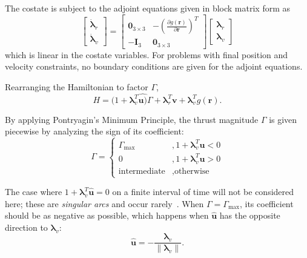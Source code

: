The costate is subject to the adjoint equations given in block matrix form as
\begin{equation}\label{eq:lambda_dot_cons}
    \begin{bmatrix}
        \dot{\boldsymbol{\lambda}}_r \\ \dot{\boldsymbol{\lambda}}_v
    \end{bmatrix} = \begin{bmatrix}
        \mathbf{0}_{3\times3} & -\left(\frac{\partial g(\mathbf{r})}{\partial \mathbf{r}}\right)^T \\
        -\mathbf{I}_3 & \mathbf{0}_{3\times3}
    \end{bmatrix} \begin{bmatrix}
        \boldsymbol{\lambda}_r \\ \boldsymbol{\lambda}_v
    \end{bmatrix}
\end{equation}
which is linear in the costate variables. For problems with final position and velocity constraints, no boundary conditions are given for the adjoint equations.

Rearranging the Hamiltonian to factor \(\Gamma \), 
\begin{equation}
    H = (1 + \boldsymbol{\lambda}_v^T \hat{\mathbf{u})} \Gamma + \boldsymbol{\lambda}_r^T \mathbf{v} + \boldsymbol{\lambda}_v^T g(\mathbf{r}).
\end{equation}

By applying Pontryagin's Minimum Principle, the thrust magnitude \(\Gamma\) is given piecewise by analyzing the sign of its coefficient:
\begin{equation}
    \Gamma = \begin{cases}
        \Gamma_{\max}&, 1+\boldsymbol{\lambda}_v^T \hat{\mathbf{u}} < 0 \\
        0&, 1 + \boldsymbol{\lambda}_v^T \hat{\mathbf{u}} > 0 \\
        \text{intermediate}&, \text{otherwise}
    \end{cases}
\end{equation}

The case where \(1 + \boldsymbol{\lambda}_v^T \hat{\mathbf{u}} = 0\) on a finite interval of time will not be considered here; these are \textit{singular arcs} and occur rarely~\cite{singular_arcs}. When \(\Gamma = \Gamma_{\max}\), its coefficient should be as negative as possible, which happens when \(\hat{\mathbf{u}}\) has the opposite direction to \(\boldsymbol{\lambda}_v\):
\begin{equation}
    \hat{\mathbf{u}} = - \frac{\boldsymbol{\lambda}_v}{\lVert \boldsymbol{\lambda}_v \rVert}.
\end{equation}


